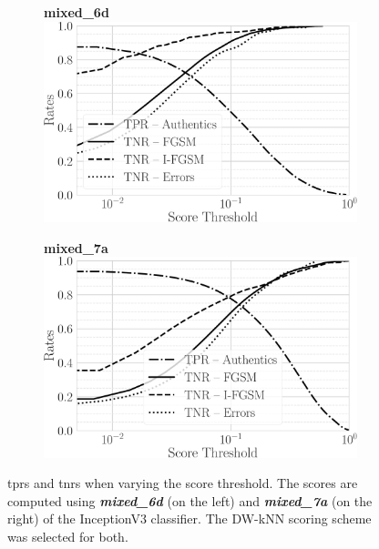 \begin{figure}
\centering%
\begin{subfigure}[t]{0.5\linewidth}%
\centering
\textbf{mixed\_6d}\\
\includegraphics[width=\linewidth]{rates-mixed_6d-dwknn}%
\label{fig:adv:score-density-mixed_6e}%
\end{subfigure}%
%
\begin{subfigure}[t]{0.5\linewidth}%
\centering
\textbf{mixed\_7a}\\
\includegraphics[width=\linewidth]{rates-mixed_7a-dwknn}%
\label{fig:adv:score-density-mixed_7a}%
\end{subfigure}%
\caption{\glspl{tpr} and \glspl{tnr} when varying the score threshold. The scores are computed using \textbf{\emph{mixed\_6d}} (on the left) and \textbf{\emph{mixed\_7a}} (on the right) of the InceptionV3 classifier.
The DW-kNN scoring scheme was selected for both.}
\label{fig:adv:i3-distr}
\end{figure}

